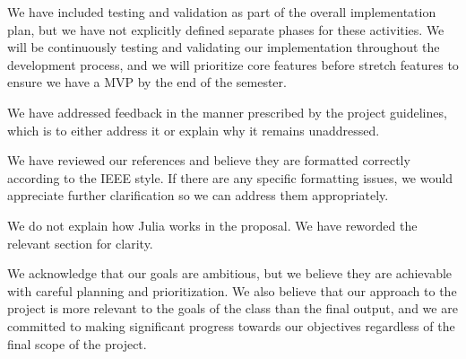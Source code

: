 {%
{
  We have included testing and validation as part of the overall implementation plan, but we have not explicitly defined separate phases for these activities. We will be continuously testing and validating our implementation throughout the development process, and we will prioritize core features before stretch features to ensure we have a MVP by the end of the semester.
}

{
  We have addressed feedback in the manner prescribed by the project guidelines, which is to either address it or explain why it remains unaddressed.
}

{
  We have reviewed our references and believe they are formatted correctly according to the IEEE style. If there are any specific formatting issues, we would appreciate further clarification so we can address them appropriately.
}

\feedbackdivider

{
  We do not explain how Julia works in the proposal. We have reworded the relevant section for clarity.
}

{}

{}

{
  We acknowledge that our goals are ambitious, but we believe they are achievable with careful planning and prioritization. We also believe that our approach to the project is more relevant to the goals of the class than the final output, and we are committed to making significant progress towards our objectives regardless of the final scope of the project.
}

}
